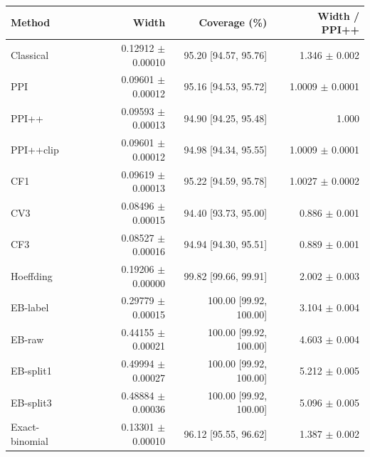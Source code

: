 \small
\begin{tabular}{lrrr}
\toprule
Method & Width & Coverage (\%) & Width / PPI++ \\
\midrule
Classical & 0.12912 $\pm$ 0.00010 & 95.20 [94.57, 95.76] & 1.346 $\pm$ 0.002 \\
PPI & 0.09601 $\pm$ 0.00012 & 95.16 [94.53, 95.72] & 1.0009 $\pm$ 0.0001 \\
PPI++ & 0.09593 $\pm$ 0.00013 & 94.90 [94.25, 95.48] & 1.000 \\
PPI++clip & 0.09601 $\pm$ 0.00012 & 94.98 [94.34, 95.55] & 1.0009 $\pm$ 0.0001 \\
CF1 & 0.09619 $\pm$ 0.00013 & 95.22 [94.59, 95.78] & 1.0027 $\pm$ 0.0002 \\
CV3 & 0.08496 $\pm$ 0.00015 & 94.40 [93.73, 95.00] & 0.886 $\pm$ 0.001 \\
CF3 & 0.08527 $\pm$ 0.00016 & 94.94 [94.30, 95.51] & 0.889 $\pm$ 0.001 \\
Hoeffding & 0.19206 $\pm$ 0.00000 & 99.82 [99.66, 99.91] & 2.002 $\pm$ 0.003 \\
EB-label & 0.29779 $\pm$ 0.00015 & 100.00 [99.92, 100.00] & 3.104 $\pm$ 0.004 \\
EB-raw & 0.44155 $\pm$ 0.00021 & 100.00 [99.92, 100.00] & 4.603 $\pm$ 0.004 \\
EB-split1 & 0.49994 $\pm$ 0.00027 & 100.00 [99.92, 100.00] & 5.212 $\pm$ 0.005 \\
EB-split3 & 0.48884 $\pm$ 0.00036 & 100.00 [99.92, 100.00] & 5.096 $\pm$ 0.005 \\
Exact-binomial & 0.13301 $\pm$ 0.00010 & 96.12 [95.55, 96.62] & 1.387 $\pm$ 0.002 \\
\bottomrule
\end{tabular}
